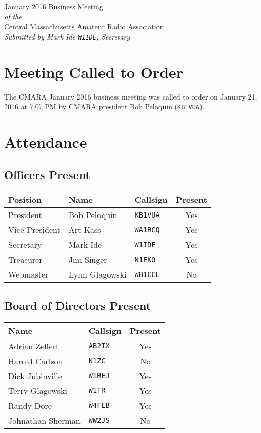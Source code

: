 \documentclass[10pt,letterpaper]{article}
\begin{document}
\begin{center}
{\huge January 2016 Business Meeting}\\
\emph{of the}\\
{\Large Central Massachusetts Amateur Radio Association}\\
\emph{Submitted by Mark Ide \texttt{W1IDE}, Secretary}
\end{center}

\section{Meeting Called to Order}
The CMARA January 2016 business meeting was called to order on January 21, 2016 at 7:07 PM by CMARA president Bob Peloquin (\texttt{KB1VUA}).

\section{Attendance}

\subsection{Officers Present}

\begin{tabular}{|l|l|l|c|}
  \hline
  \textbf{Position} & \textbf{Name}  & \textbf{Callsign} & \textbf{Present} \\ \hline
  President         & Bob Peloquin   & \texttt{KB1VUA}   & Yes              \\
  Vice President    & Art Kass       & \texttt{WA1RCQ}   & Yes              \\
  Secretary         & Mark Ide       & \texttt{W1IDE}    & Yes              \\
  Treasurer         & Jim Singer     & \texttt{N1EKO}    & Yes              \\
  Webmaster         & Lynn Glagowski & \texttt{WB1CCL}   & No               \\
  \hline
\end{tabular}

\subsection{Board of Directors Present}

\begin{tabular}{|l|l|c|}
  \hline
  \textbf{Name}     & \textbf{Callsign} & \textbf{Present} \\ \hline
  Adrian Zeffert    & \texttt{AB2IX}    & Yes              \\
  Harold Carlson    & \texttt{N1ZC}     & No               \\
  Dick Jubinville   & \texttt{W1REJ}    & Yes              \\
  Terry Glagowski   & \texttt{W1TR}     & Yes              \\
  Randy Dore        & \texttt{W4FEB}    & Yes              \\
  Johnathan Sherman & \texttt{WW2JS}    & No               \\
  \hline
\end{tabular}
\end{document}
